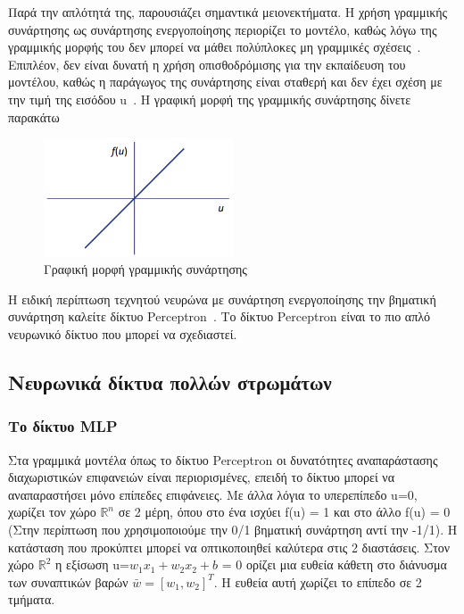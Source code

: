 \documentclass[12pt]{article}
\numberwithin{equation}{section}
\begin{document}
Παρά την απλότητά της, παρουσιάζει σημαντικά μειονεκτήματα. Η χρήση γραμμικής συνάρτησης ως συνάρτησης ενεργοποίησης περιορίζει το μοντέλο, καθώς λόγω της γραμμικής μορφής του δεν μπορεί να μάθει πολύπλοκες μη γραμμικές σχέσεις~\cite{codecademy_linear_activation_2023}. Επιπλέον, δεν είναι δυνατή η χρήση οπισθοδρόμισης για την εκπαίδευση του μοντέλου, καθώς η παράγωγος της συνάρτησης είναι σταθερή και δεν έχει σχέση με την τιμή της εισόδου u~\cite{baheti_activation_functions_2021}. Η γραφική μορφή της γραμμικής συνάρτησης δίνετε παρακάτω \\

\begin{figure}[h!]
  \centering
  \includegraphics[width=0.5\textwidth]{images/Linear.png} %
  \caption{Γραφική μορφή γραμμικής συνάρτησης}
  \label{figure 15}
\end{figure}

Η ειδική περίπτωση τεχνητού νευρώνα με συνάρτηση ενεργοποίησης την βηματική συνάρτηση καλείτε δίκτυο Perceptron~\cite{rosenblatt1958perceptron}. Το δίκτυο Perceptron είναι το πιο απλό νευρωνικό δίκτυο που μπορεί να σχεδιαστεί. 

\subsection{Νευρωνικά δίκτυα πολλών στρωμάτων}

\subsubsection{Το δίκτυο MLP}

Στα γραμμικά μοντέλα όπως το δίκτυο Perceptron οι δυνατότητες αναπαράστασης διαχωριστικών επιφανειών είναι περιορισμένες, επειδή το δίκτυο μπορεί να αναπαραστήσει μόνο επίπεδες επιφάνειες. Με άλλα λόγια το υπερεπίπεδο u=0, χωρίζει τον χώρο \(\mathbb{R}^n\) σε 2 μέρη, όπου στο ένα ισχύει f(u) = 1 και στο άλλο f(u) = 0 (Στην περίπτωση που χρησιμοποιούμε την 0/1 βηματική συνάρτηση αντί την -1/1). Η κατάσταση που προκύπτει μπορεί να οπτικοποιηθεί καλύτερα στις 2 διαστάσεις. Στον χώρο \(\mathbb{R}^2\) η εξίσωση u=\(w_1x_1 + w_2x_2 + b\) = 0 ορίζει μια ευθεία κάθετη στο διάνυσμα των συναπτικών βαρών \(\bar{w} = [w_1, w_2]^T\). Η ευθεία αυτή χωρίζει το επίπεδο σε 2 τμήματα. 
\end{document}
